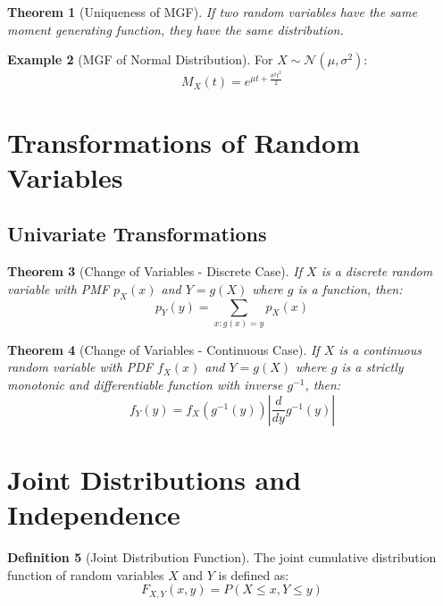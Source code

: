 \documentclass[12pt,a4paper]{article}
\theoremstyle{plain}
\newtheorem{theorem}{Theorem}[section]
\theoremstyle{definition}
\newtheorem{definition}[theorem]{Definition}
\newtheorem{example}[theorem]{Example}
\begin{document}
\begin{theorem}[Uniqueness of MGF]
If two random variables have the same moment generating function, they have the same distribution.
\end{theorem}

\begin{example}[MGF of Normal Distribution]
For $X \sim \mathcal{N}(\mu, \sigma^2)$:
\begin{equation}
M_X(t) = e^{\mu t + \frac{\sigma^2 t^2}{2}}
\end{equation}
\end{example}

\section{Transformations of Random Variables}

\subsection{Univariate Transformations}

\begin{theorem}[Change of Variables - Discrete Case]
If $X$ is a discrete random variable with PMF $p_X(x)$ and $Y = g(X)$ where $g$ is a function, then:
\begin{equation}
p_Y(y) = \sum_{x: g(x) = y} p_X(x)
\end{equation}
\end{theorem}

\begin{theorem}[Change of Variables - Continuous Case]
If $X$ is a continuous random variable with PDF $f_X(x)$ and $Y = g(X)$ where $g$ is a strictly monotonic and differentiable function with inverse $g^{-1}$, then:
\begin{equation}
f_Y(y) = f_X(g^{-1}(y)) \left| \frac{d}{dy}g^{-1}(y) \right|
\end{equation}
\end{theorem}

\section{Joint Distributions and Independence}

\begin{definition}[Joint Distribution Function]
The joint cumulative distribution function of random variables $X$ and $Y$ is defined as:
\begin{equation}
F_{X,Y}(x,y) = P(X \leq x, Y \leq y)
\end{equation}
\end{definition}
\end{document}
